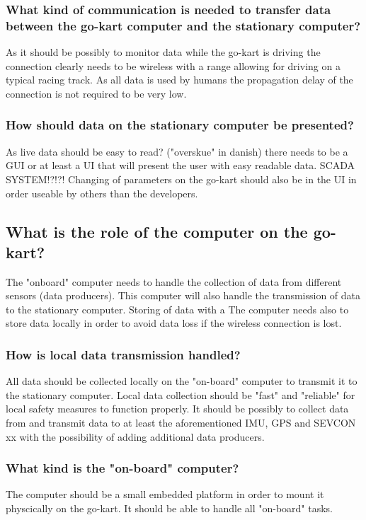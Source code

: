 \subsubsection*{What kind of communication is needed to transfer data between the go-kart computer and the stationary computer?}
As it should be possibly to monitor data while the go-kart is driving the connection clearly needs to be wireless with a range allowing for driving on a typical racing track. 
As all data is used by humans the propagation delay of the connection is not required to be very low.

\subsubsection*{How should data on the stationary computer be presented?}
As live data should be easy to read? ("overskue" in danish) there needs to be a GUI or at least a UI that will present the user with easy readable data. SCADA SYSTEM!?!?!
Changing of parameters on the go-kart should also be in the UI in order useable by others than the developers.

\subsection{What is the role of the computer on the go-kart?}
The "onboard" computer needs to handle the collection
of data from different sensors (data producers).
This computer will also handle the transmission of data to the stationary 
computer.
Storing of data with a 
The computer needs also to store data locally in order to avoid data loss if the wireless connection is lost.

\subsubsection*{How is local data transmission handled?}
All data should be collected locally on the "on-board" computer to transmit it to the stationary computer.
Local data collection should be "fast" and "reliable" for local safety measures to function properly.
It should be possibly to collect data from and transmit data to at least the 
aforementioned IMU, GPS and SEVCON xx with the possibility of adding additional 
data producers.

\subsubsection*{What kind is the "on-board" computer?}
The computer should be a small embedded platform in order to mount it physcically on the go-kart.
It should be able to handle all "on-board" tasks.


